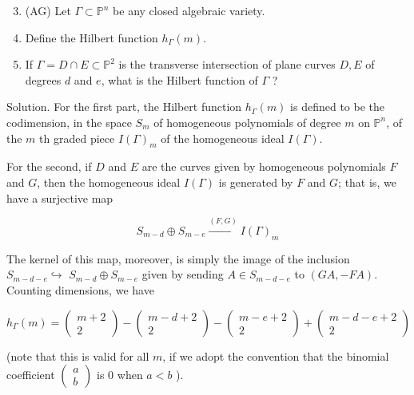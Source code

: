 \documentclass[10pt]{article}
\begin{document}
\begin{enumerate}
  \setcounter{enumi}{2}
  \item (AG) Let $\Gamma \subset \mathbb{P}^{n}$ be any closed algebraic variety.

  \item Define the Hilbert function $h_{\Gamma}(m)$.

  \item If $\Gamma=D \cap E \subset \mathbb{P}^{2}$ is the transverse intersection of plane curves $D, E$ of degrees $d$ and $e$, what is the Hilbert function of $\Gamma$ ?

\end{enumerate}

Solution. For the first part, the Hilbert function $h_{\Gamma}(m)$ is defined to be the codimension, in the space $S_{m}$ of homogeneous polynomials of degree $m$ on $\mathbb{P}^{n}$, of the $m$ th graded piece $I(\Gamma)_{m}$ of the homogeneous ideal $I(\Gamma)$.

For the second, if $D$ and $E$ are the curves given by homogeneous polynomials $F$ and $G$, then the homogeneous ideal $I(\Gamma)$ is generated by $F$ and $G$; that is, we have a surjective map

$$
S_{m-d} \oplus S_{m-e} \stackrel{(F, G)}{\longrightarrow} I(\Gamma)_{m}
$$

The kernel of this map, moreover, is simply the image of the inclusion $S_{m-d-e} \hookrightarrow$ $S_{m-d} \oplus S_{m-e}$ given by sending $A \in S_{m-d-e}$ to $(G A,-F A)$. Counting dimensions, we have

$$
h_{\Gamma}(m)=\left(\begin{array}{c}
m+2 \\
2
\end{array}\right)-\left(\begin{array}{c}
m-d+2 \\
2
\end{array}\right)-\left(\begin{array}{c}
m-e+2 \\
2
\end{array}\right)+\left(\begin{array}{c}
m-d-e+2 \\
2
\end{array}\right)
$$

(note that this is valid for all $m$, if we adopt the convention that the binomial coefficient $\left(\begin{array}{l}a \\ b\end{array}\right)$ is 0 when $a<b$ ).
\end{document}
